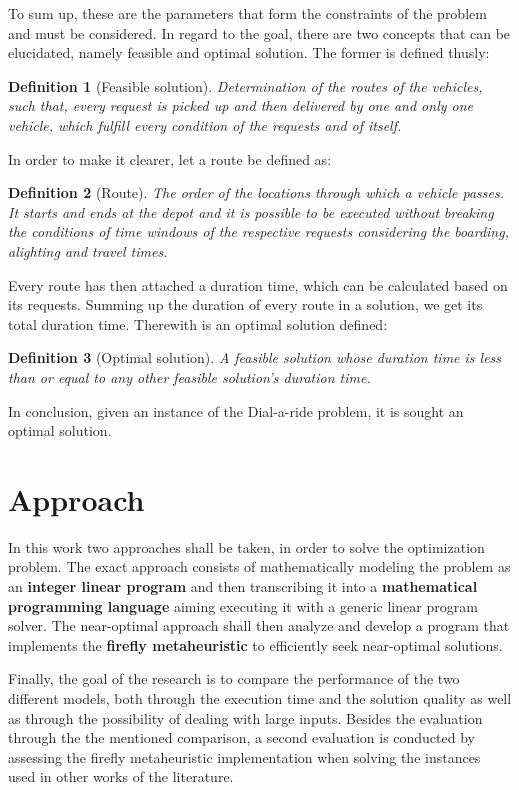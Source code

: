 \documentclass[tuberlin,cic,tc,openright,english,noabntcite,oneside]{iiufrgs}
\newtheorem{definition}{Definition}
\begin{document}
To sum up, these are the parameters that form the constraints of the problem and must be considered. In regard to the goal, there are two concepts that can be elucidated, namely feasible and optimal solution. The former is defined thusly:
\begin{definition}[Feasible solution]
Determination of the routes of the vehicles, such that, every request is picked up and then delivered by one and only one vehicle, which fulfill every condition of the requests and of itself.
\end{definition}

In order to make it clearer, let a route be defined as:
\begin{definition}[Route]
The order of the locations through which a vehicle passes. It starts and ends at the depot and it is possible to be executed without breaking the conditions of time windows of the respective requests considering the boarding, alighting and travel times.
\end{definition}

Every route has then attached a duration time, which can be calculated based on its requests. Summing up the duration of every route in a solution, we get its total duration time. Therewith is an optimal solution defined:
\begin{definition}[Optimal solution]
A feasible solution whose duration time is less than or equal to any other feasible solution's duration time.
\end{definition}

In conclusion, given an instance of the Dial-a-ride problem, it is sought an optimal solution.

\section{Approach}
In this work two approaches shall be taken, in order to solve the optimization problem. The exact approach consists of mathematically modeling the problem as an \textbf{integer linear program} and then transcribing it into a \textbf{mathematical programming language} aiming executing it with a generic linear program solver. The near-optimal approach shall then analyze and develop a program that implements the \textbf{firefly metaheuristic} to efficiently seek near-optimal solutions.

Finally, the goal of the research is to compare the performance of the two different models, both through the execution time and the solution quality as well as through the possibility of dealing with large inputs. Besides the evaluation through the the mentioned comparison, a second evaluation is conducted by assessing the firefly metaheuristic implementation when solving the instances used in other works of the literature.
\end{document}
